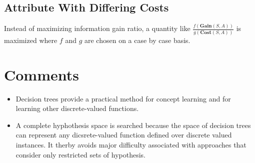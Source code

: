 \documentclass[11pt, a4paper]{article}
\begin{document}
\subsection{Attribute With Differing Costs}
Instead of maximizing information gain ratio, a quantity like $\frac{f(\textbf{Gain}(S, A))}{g(\textbf{Cost}(S, A))}$ is maximized where $f$ and $g$ are chosen on a case by case basis.

\section{Comments}

\begin{itemize}
	\item Decision trees provide a practical method for concept learning and for learning other discrete-valued functions.
	\item A complete hyphothesis space is searched because the space of decision trees can represent any dicsrete-valued function defined over discrete valued instances. It therby avoids major difficulty associated with approaches that consider only restricted sets of hypothesis.
\end{itemize}
\end{document}
